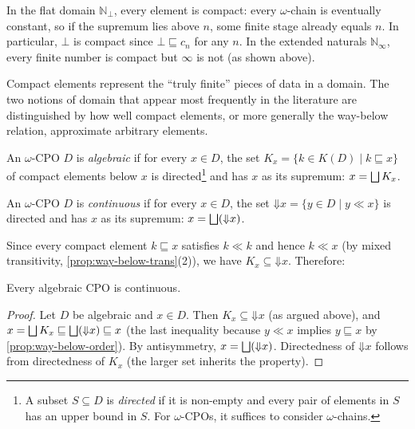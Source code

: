 \begin{example}
\label{ex:compact}
In the flat domain $\mathbb{N}_\bot$, every element is compact: every
$\omega$-chain is eventually constant, so if the supremum lies above $n$,
some finite stage already equals $n$. In particular, $\bot$ is compact
since $\bot \sqsubseteq c_n$ for any $n$. In the extended naturals
$\mathbb{N}_\infty$, every finite number is compact but $\infty$ is not
(as shown above).
\end{example}

Compact elements represent the ``truly finite'' pieces of data in a
domain. The two notions of domain that appear most frequently in the
literature are distinguished by how well compact elements, or more
generally the way-below relation, approximate arbitrary elements.

\begin{definition}
\label{def:algebraic}
An $\omega$-CPO $D$ is \emph{algebraic} if for every $x \in D$, the set
$K_x = \{k \in K(D) \mid k \sqsubseteq x\}$ of compact elements below
$x$ is directed\footnote{A subset $S \subseteq D$ is \emph{directed} if
it is non-empty and every pair of elements in $S$ has an upper bound in
$S$. For $\omega$-CPOs, it suffices to consider $\omega$-chains.} and
has $x$ as its supremum: $x = \bigsqcup K_x$.
\end{definition}

\begin{definition}
\label{def:continuous-cpo}
An $\omega$-CPO $D$ is \emph{continuous} if for every $x \in D$, the set
$\mathord{\Downarrow} x = \{y \in D \mid y \ll x\}$ is directed and has
$x$ as its supremum: $x = \bigsqcup (\mathord{\Downarrow} x)$.
\end{definition}

Since every compact element $k \sqsubseteq x$ satisfies $k \ll k$ and
hence $k \ll x$ (by mixed transitivity,
\cref{prop:way-below-trans}(2)), we have $K_x \subseteq
\mathord{\Downarrow} x$. Therefore:

\begin{proposition}
\label{prop:algebraic-continuous}
Every algebraic CPO is continuous.
\end{proposition}

\begin{proof}
Let $D$ be algebraic and $x \in D$. Then
$K_x \subseteq \mathord{\Downarrow} x$ (as argued above), and
$x = \bigsqcup K_x \sqsubseteq \bigsqcup (\mathord{\Downarrow} x) \sqsubseteq x$
(the last inequality because $y \ll x$ implies $y \sqsubseteq x$ by
\cref{prop:way-below-order}). By antisymmetry,
$x = \bigsqcup (\mathord{\Downarrow} x)$. Directedness of
$\mathord{\Downarrow} x$ follows from directedness of $K_x$ (the larger
set inherits the property).
\end{proof}

